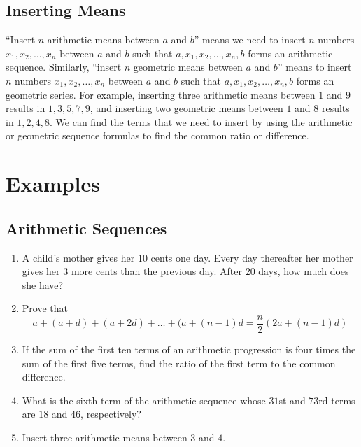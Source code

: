 \documentclass{article}
\begin{document}
\begin{multicols}{2}
        \subsection*{Inserting Means}
        ``Insert $n$ arithmetic means between $a$ and $b$'' means we need to
        insert $n$ numbers $x_1, x_2, \dots, x_n$ between $a$ and $b$ such that
        $a, x_1, x_2, \dots, x_n, b$ forms an arithmetic sequence. Similarly,
        ``insert $n$ geometric means between $a$ and $b$'' means to insert $n$
        numbers $x_1, x_2, \dots, x_n$ between $a$ and $b$ such that $a, x_1,
        x_2, \dots, x_n, b$ forms an geometric series. For example, inserting
        three arithmetic means between $1$ and $9$ results in $1, 3, 5, 7, 9$,
        and inserting two geometric means between $1$ and $8$ results in $1, 2,
        4, 8$. We can find the terms that we need to insert by using the
        arithmetic or geometric sequence formulas to find the common ratio or
        difference.

        \section*{Examples}
        \subsection*{Arithmetic Sequences}
        \begin{enumerate}
            \item A child’s mother gives her $10$ cents one day. Every day
            thereafter her mother gives her $3$ more cents than the previous
            day. After $20$ days, how much does she have?
            \vspace{3cm}
            \item Prove that
            \[a + (a + d) + (a + 2d) + \dots + (a + (n - 1)d = \frac{n}{2}(2a +
            (n - 1)d)\]
            \vspace{3cm}
            \item If the sum of the first ten terms of an arithmetic progression
            is four times the sum of the first five terms, find the ratio of the
            first term to the common difference.
            \vspace{3cm}
            \item What is the sixth term of the arithmetic sequence whose $31$st
            and $73$rd terms are $18$ and $46$, respectively?
            \vspace{3cm}
            \item Insert three arithmetic means between $3$ and $4$.
            \vspace{3cm}
        \end{enumerate}

\end{multicols}
\end{document}

